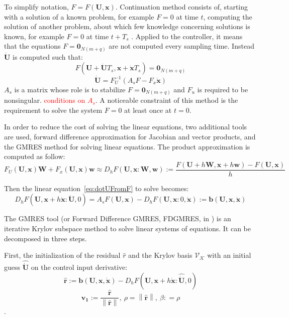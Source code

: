 \documentclass[a4paper, 12pt]{report}
\newcommand\norm[1]{\left\lVert#1\right\rVert}
\begin{document}
To simplify notation, $F = F(\boldsymbol{U},\boldsymbol{x})$. Continuation method consists of, starting with a solution of a known problem, for example $F = 0$ at time $t$, computing the solution of another problem, about which few knowledge concerning solutions is known, for example $F = 0$ at time $t + T_s$ \cite{Allgower1987}. Applied to the controller, it means that the equations $F = \boldsymbol{0}_{N(m+q)}$ are not computed every sampling time. Instead $\boldsymbol{\dot U}$ is computed such that:
\[ F(\boldsymbol{U} + \boldsymbol{\dot U}T_s,\boldsymbol{x} + \boldsymbol{\dot x} T_s) = \boldsymbol{0}_{N(m+q)} \]
\begin{equation}
\label{eq:dotUFromF}
\boldsymbol{\dot U} = F_U^{-1}(A_s F - F_x \boldsymbol{\dot x}) 
\end{equation}
$A_s$ is a matrix whose role is to stabilize $F = \boldsymbol{0}_{N(m+q)}$ and $F_u$ is required to be nonsingular. \textcolor{red}{conditions on $A_s$}. A noticeable constraint of this method is the requirement to solve the system $F=0$ at least once at $t=0$.

In order to reduce the cost of solving the linear equations, two additional tools are used, forward difference approximation for Jacobian and vector products, and the GMRES method for solving linear equations.
The product approximation is computed as follow:
\[ F_U(\boldsymbol{U}, \boldsymbol{x}) \boldsymbol{W} + F_x(\boldsymbol{U}, \boldsymbol{x}) \boldsymbol{w} \approx D_h F(\boldsymbol{U}, \boldsymbol{x} : \boldsymbol{W}, \boldsymbol{w}) := \frac{F(\boldsymbol{U} + h\boldsymbol{W}, \boldsymbol{x} + h\boldsymbol{w}) - F(\boldsymbol{U}, \boldsymbol{x})}{h} \]

Then the linear equation~\ref{eq:dotUFromF} to solve becomes:
\[ D_h F(\boldsymbol{U}, \boldsymbol{x}+ h\boldsymbol{\dot x} : \boldsymbol{\dot U}, 0) = A_s F(\boldsymbol{U}, \boldsymbol{x}) - D_h F(\boldsymbol{U}, \boldsymbol{x} : 0, \boldsymbol{\dot x}) := \boldsymbol{b}(\boldsymbol{U}, \boldsymbol{x}, \boldsymbol{\dot x}) \]

The GMRES tool (or Forward Difference GMRES, FDGMRES, in \cite{Kelley1995}) is an iterative Krylov subspace method to solve linear systems of equations. It can be decomposed in three steps.

First, the initialization of the residual $\hat r$ and the Krylov basis $\mathcal{V}_\mathcal{K}$ with an initial guess $\boldsymbol{\hat{ \dot U}}$ on the control input derivative:
\[ \boldsymbol{\hat r} := \boldsymbol{b}(\boldsymbol{U}, \boldsymbol{x}, \boldsymbol{\dot x}) - D_h F(\boldsymbol{U}, \boldsymbol{x}+ h\boldsymbol{\dot x} : \boldsymbol{\hat{\dot U}}, 0) \]
\[\boldsymbol{v_1} := \frac{\boldsymbol{\hat r}}{\norm{\boldsymbol{\hat r}}},\ \rho = \norm{\boldsymbol{\hat r}},\ \beta: = \rho \].
\end{document}
